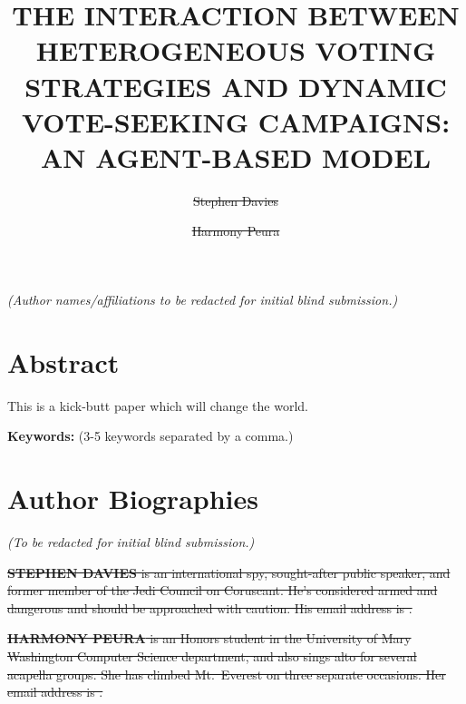 \documentclass{scspaperproc}
\begin{document}

\def\SCSconferencename{Annual Simulation Conference}

\def\SCSconferenceacro{ANNSIM'24}

\def\SCSpublicationyear{2024}

\def\SCSconferenceeditors{P.J. Giabbanelli, I. David, C. Ruiz-Martin, B. Oakes and R. C\'{a}rdenas}

\def\SCSconferencedates{May 20-23}

\def\SCSconferencevenue{American University, DC, USA}

\title{THE INTERACTION BETWEEN HETEROGENEOUS VOTING STRATEGIES AND DYNAMIC
VOTE-SEEKING CAMPAIGNS: AN AGENT-BASED MODEL}

\textit{(Author names/affiliations to be redacted for initial blind submission.)}
\author[\authorrefmark{1}]{\sout{Stephen Davies}}
\author[\authorrefmark{1}]{\sout{Harmony Peura}}



\maketitle

\section*{Abstract}

This is a kick-butt paper which will change the world.


\textbf{Keywords:} (3-5 keywords separated by a comma.)















\section*{Author Biographies}

\textit{(To be redacted for initial blind submission.)}

\sout{\textbf{\uppercase{Stephen Davies}} is an international spy, sought-after
public speaker, and former member of the Jedi Council on Coruscant. He's
considered armed and dangerous and should be approached with caution.
His email address is .}

\sout{\textbf{\uppercase{Harmony Peura}} is an Honors student in the University of
Mary Washington Computer Science department, and also sings alto for several
acapella groups. She has climbed Mt.~Everest on three separate occasions. Her
email address is .}
\end{document}
